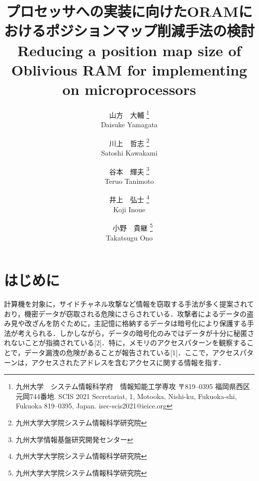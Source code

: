 \documentclass{jarticle}
\begin{document}
\title{
  プロセッサへの実装に向けたORAMにおけるポジションマップ削減手法の検討\\
  Reducing a position map size of Oblivious RAM for implementing on microprocessors
}



\author{
  山方　大輔
  \thanks{
    九州大学　システム情報科学府　情報知能工学専攻 %
    〒819--0395 福岡県西区元岡744番地.  %
    SCIS 2021 Secretariat,
    1, Motooka, Nishi-ku, Fukuoka-shi, Fukuoka 819--0395, Japan. %
    isec-scis2021@ieice.org}\\
  Daisuke Yamagata
  \and
  川上　哲志
  \thanks{
    九州大学大学院システム情報科学研究院}\\
  Satoshi Kawakami
  \and
  谷本　輝夫
  \thanks{
    九州大学情報基盤研究開発センター}\\
  Teruo Tanimoto
  \and
  井上　弘士
  \thanks{
    九州大学大学院システム情報科学研究院}\\
  Koji Inoue
  \and
　小野　貴継
  \thanks{
    九州大学大学院システム情報科学研究院}\\
  Takatsugu Ono
}



\maketitle

\section{はじめに}
 計算機を対象に，サイドチャネル攻撃など情報を窃取する手法が多く提案されており，機密データが窃取される危険にさらされている．攻撃者によるデータの盗み見や改ざんを防ぐために，主記憶に格納するデータは暗号化により保護する手法が考えられる．しかしながら，データの暗号化のみではデータが十分に秘匿されないことが指摘されている[2]．特に，メモリのアクセスパターンを観察することで，データ漏洩の危険があることが報告されている[1]．ここで，アクセスパターンは，アクセスされたアドレスを含むアクセスに関する情報を指す．
\end{document}
